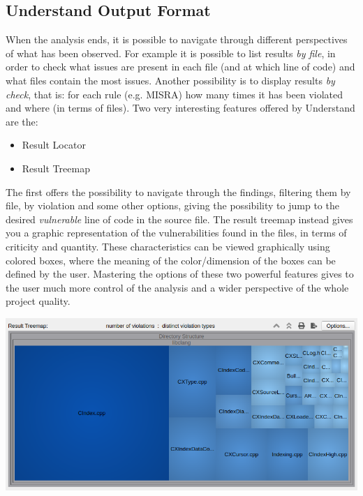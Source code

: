 \subsection{Understand Output Format}

When the analysis ends, it is possible to navigate through different perspectives of what has been observed. For example it is possible to list results \textsl{by file}, in order to check what issues are present in each file (and at which line of code) and what files contain the most issues. Another possibility is to display results \textsl{by check}, that is: for each rule (e.g. MISRA) how many times it has been violated and where (in terms of files).\newline
Two very interesting features offered by Understand are the:
\begin{itemize}
	\item Result Locator
	\item Result Treemap
\end{itemize}

The first offers the possibility to navigate through the findings, filtering them by file, by violation and some other options, giving the possibility to jump to the desired \textsl{vulnerable} line of code in the source file.\newline
The result treemap instead gives you a graphic representation of the vulnerabilities found in the files, in terms of criticity and quantity. These characteristics can be viewed graphically using colored boxes, where the meaning of the color/dimension of the boxes can be defined by the user.\newline
Mastering the options of these two powerful features gives to the user much more control of the analysis and a wider perspective of the whole project quality.\newline\newline

\vspace{1cm}
\begin{minipage}{\linewidth}
	\includegraphics[width=\textwidth]{img/AllChecksTreeMap.png}
\end{minipage}
\vspace{1cm}

